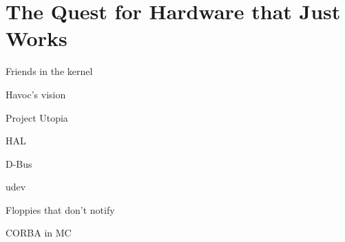 \chapter{The Quest for Hardware that Just Works}

Friends in the kernel

Havoc's vision

Project Utopia

HAL

D-Bus

udev

Floppies that don't notify

CORBA in MC
